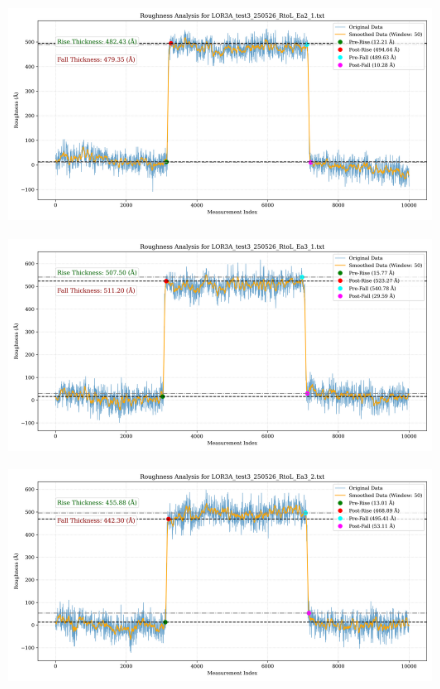 \documentclass[platex,dvipdfmx,10pt,twoside,a4paper,jis2004]{jsarticle}
\begin{document}
\begin{figure}[H]
    \centering
    \includegraphics[width=\textwidth]{LOR3A_test3_250526_RtoL_Ea2_1.png}
    \label{fig:LOR3Atest3250526RtoLEa21}
\end{figure}
\begin{figure}[H]
    \centering
    \includegraphics[width=\textwidth]{LOR3A_test3_250526_RtoL_Ea3_1.png}
    \label{fig:LOR3Atest3250526RtoLEa31}
\end{figure}
\begin{figure}[H]
    \centering
    \includegraphics[width=\textwidth]{LOR3A_test3_250526_RtoL_Ea3_2.png}
    \label{fig:LOR3Atest3250526RtoLEa32}
\end{figure}
\end{document}
